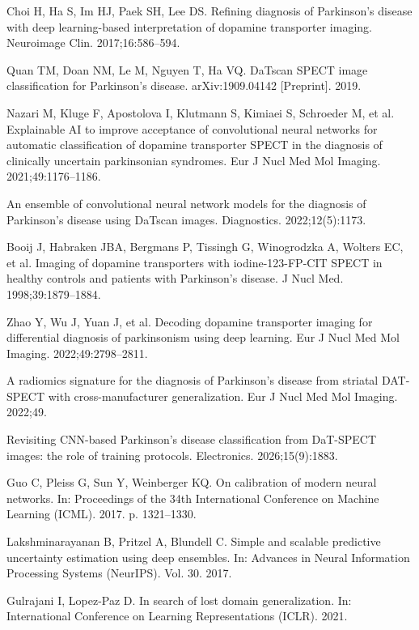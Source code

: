 \documentclass[11pt]{article}
\begin{document}
\begin{enumerate}[label={[\arabic*]}, leftmargin=2.2em]
\item Choi H, Ha S, Im HJ, Paek SH, Lee DS. Refining diagnosis of Parkinson's disease with deep learning-based interpretation of dopamine transporter imaging. Neuroimage Clin. 2017;16:586--594.
\item Quan TM, Doan NM, Le M, Nguyen T, Ha VQ. DaTscan SPECT image classification for Parkinson's disease. arXiv:1909.04142 [Preprint]. 2019.
\item Nazari M, Kluge F, Apostolova I, Klutmann S, Kimiaei S, Schroeder M, et al. Explainable AI to improve acceptance of convolutional neural networks for automatic classification of dopamine transporter SPECT in the diagnosis of clinically uncertain parkinsonian syndromes. Eur J Nucl Med Mol Imaging. 2021;49:1176--1186.
\item An ensemble of convolutional neural network models for the diagnosis of Parkinson's disease using DaTscan images. Diagnostics. 2022;12(5):1173.
\item Booij J, Habraken JBA, Bergmans P, Tissingh G, Winogrodzka A, Wolters EC, et al. Imaging of dopamine transporters with iodine-123-FP-CIT SPECT in healthy controls and patients with Parkinson's disease. J Nucl Med. 1998;39:1879--1884.
\item Zhao Y, Wu J, Yuan J, et al. Decoding dopamine transporter imaging for differential diagnosis of parkinsonism using deep learning. Eur J Nucl Med Mol Imaging. 2022;49:2798--2811.
\item A radiomics signature for the diagnosis of Parkinson's disease from striatal DAT-SPECT with cross-manufacturer generalization. Eur J Nucl Med Mol Imaging. 2022;49.
\item Revisiting CNN-based Parkinson's disease classification from DaT-SPECT images: the role of training protocols. Electronics. 2026;15(9):1883.
\item Guo C, Pleiss G, Sun Y, Weinberger KQ. On calibration of modern neural networks. In: Proceedings of the 34th International Conference on Machine Learning (ICML). 2017. p. 1321--1330.
\item Lakshminarayanan B, Pritzel A, Blundell C. Simple and scalable predictive uncertainty estimation using deep ensembles. In: Advances in Neural Information Processing Systems (NeurIPS). Vol. 30. 2017.
\item Gulrajani I, Lopez-Paz D. In search of lost domain generalization. In: International Conference on Learning Representations (ICLR). 2021.
\end{enumerate}
\end{document}

